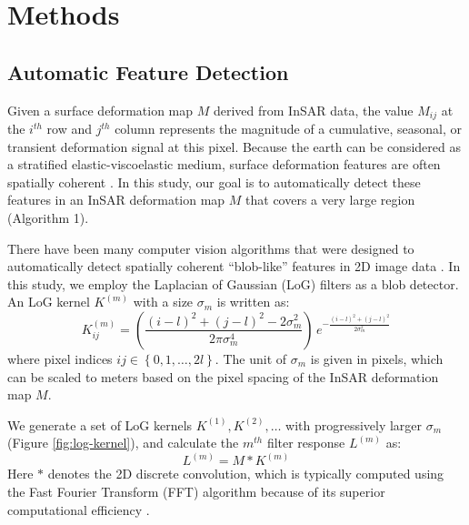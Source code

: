 \documentclass{utexasthesis}
\begin{document}
\section{Methods}
\label{sec:methods}


\subsection{Automatic Feature Detection}
\label{subsec:methods-1-log}

Given a surface deformation map $M$ derived from InSAR data, the value $ M_{ij} $ at the $i^{th}$ row and $j^{th}$ column represents the magnitude of a cumulative, seasonal, or transient deformation signal at this pixel. Because the earth can be considered as a stratified elastic-viscoelastic medium, surface deformation features are often spatially coherent \cite{Segall2010EarthquakeVolcanoDeformation}. In this study, our goal is to automatically detect these features in an InSAR deformation map $M$ that covers a very large region (Algorithm 1).

There have been many computer vision algorithms that were designed to automatically detect spatially coherent ``blob-like'' features in 2D image data \cite{Lindeberg1993DetectingSalientBlob, Lindeberg1998FeatureDetectionAutomatic, Lowe2004DistinctiveImageFeatures}. In this study, we employ the Laplacian of Gaussian (LoG) filters as a blob detector. An LoG kernel $K^{(m)}$ with a size $\sigma_m$ is written as:
\begin{equation}
	K^{(m)}_{ij} = \left(\frac{(i - l)^2 + (j - l)^2 - 2\sigma_m^2}{2 \pi \sigma_m^4}\right) \, e^{-\frac{ (i - l)^2 + (j - l)^2}{2 \sigma_m^2}} \label{eq:log-kernel}
\end{equation}
where pixel indices $ij  \in \left\lbrace 0, 1, \ldots, 2l \right\rbrace$. The unit of $\sigma_m$ is given in pixels, which can be scaled to meters based on the pixel spacing of the InSAR deformation map $M$.


We generate a set of LoG kernels $K^{(1)}, K^{(2)}, \ldots$ with progressively larger $\sigma_m$ (Figure \ref{fig:log-kernel}), and calculate the $m^{th}$ filter response $ L^{(m)} $ as:
\begin{equation}
	L^{(m)} = M \ast K^{(m)}  \label{eq:log-layer-conv}
\end{equation}
Here $*$ denotes the 2D discrete convolution, which is typically computed using the Fast Fourier Transform (FFT) algorithm because of its superior computational efficiency \cite{Szeliski2022ComputerVision}.
\end{document}
